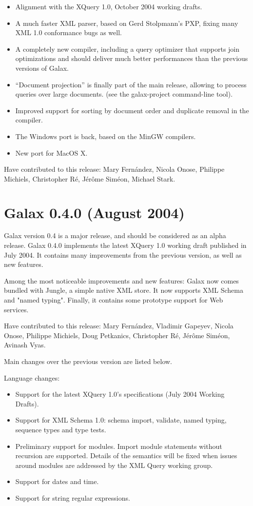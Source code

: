 \begin{itemize}
\item Alignment with the XQuery 1.0, October 2004 working drafts.
\item A much faster XML parser, based on Gerd Stolpmann's PXP, fixing
  many XML 1.0 conformance bugs as well.
\item A completely new compiler, including a query optimizer that
  supports join optimizations and should deliver much better
  performances than the previous versions of Galax.
\item ``Document projection'' is finally part of the main release,
  allowing to process queries over large documents. (see the
  galax-project command-line tool).
\item Improved support for sorting by document order and duplicate
  removal in the compiler.
\item The Windows port is back, based on the MinGW compilers.
\item New port for MacOS X.
\end{itemize}

Have contributed to this release:
  Mary Fern\'andez, Nicola Onose, Philippe Michiels, Christopher R\'e,
  J\'er\^ome Sim\'eon, Michael Stark.

\section{Galax 0.4.0 (August 2004)}

Galax version 0.4 is a major release, and should be considered as an
alpha release. Galax 0.4.0 implements the latest XQuery 1.0 working
draft published in July 2004. It contains many improvements from the
previous version, as well as new features.

Among the most noticeable improvements and new features: Galax now
comes bundled with Jungle, a simple native XML store. It now supports
XML Schema and "named typing". Finally, it contains some prototype
support for Web services.

Have contributed to this release:
  Mary Fern\'andez, Vladimir Gapeyev, Nicola Onose, Philippe Michiels,
  Doug Petkanics, Christopher R\'e, J\'er\^ome Sim\'eon, Avinash Vyas.

Main changes over the previous version are listed below.

Language changes:
\begin{itemize}
\item Support for the latest XQuery 1.0's specifications (July 2004
  Working Drafts).
\item Support for XML Schema 1.0: schema import, validate, named typing,
  sequence types and type tests.
\item Preliminary support for modules. Import module statements without
  recursion are supported. Details of the semantics will be fixed when
  issues around modules are addressed by the XML Query working group.
\item Support for dates and time.
\item Support for string regular expressions.
\end{itemize}


